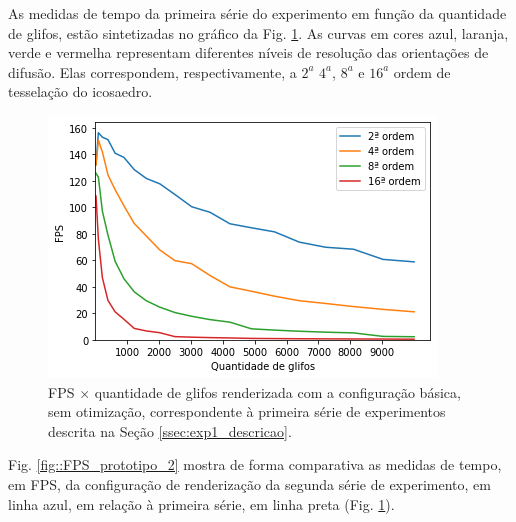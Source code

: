 As medidas de tempo da primeira série do experimento em função da quantidade de glifos, estão sintetizadas no gráfico da Fig. \ref{fig::FPS_prototipo_1}. As curvas em cores azul, laranja, verde e vermelha representam diferentes níveis de resolução das orientações de difusão. Elas correspondem, respectivamente, a $2^{a}$ $4^{a}$, $8^{a}$ e $16^{a}$ ordem de tesselação do icosaedro.



\begin{figure}[ht]
    \centering
    \includegraphics[width=.65\linewidth, angle=0]{figs/Renderizacao_glifos_evolucao/FPS_prototipo1_Geral_legendado.png}
    \caption{FPS $\times$ quantidade de glifos renderizada com a configuração básica, sem otimização, correspondente à primeira série de experimentos descrita na Seção \ref{ssec:exp1_descricao}.}
    \label{fig::FPS_prototipo_1}
\end{figure}

Fig. \ref{fig::FPS_prototipo_2} mostra de forma comparativa as medidas de tempo, em FPS, da configuração de renderização da segunda série de experimento, em linha azul, em relação à primeira série, em linha preta (Fig. \ref{fig::FPS_prototipo_1}).

